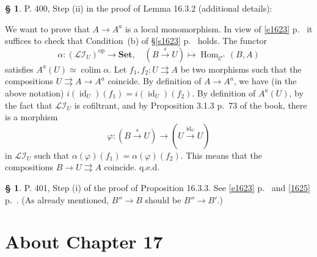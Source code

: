\documentclass[12pt]{article}%
\theoremstyle{remark}
\theoremstyle{definition}
\newtheorem{s}[thm]{\S}%
\newcommand{\cc}{\mathcal}
\newcommand{\C}{\mathcal C}
\newcommand{\Set}{\mathbf{Set}}
\newcommand{\parar}{\rightrightarrows}
\newcommand{\xr}{\xrightarrow}
\DeclareMathOperator*{\colim}{colim}
\DeclareMathOperator{\id}{id}
\DeclareMathOperator{\Hom}{Hom}%
\DeclareMathOperator{\op}{op}
\begin{document}
%

\begin{s} 
P. 400, Step (ii) in the proof of Lemma 16.3.2 (additional details):

We want to prove that $A\to A^a$ is a local monomorphism. In view of \eqref{e1623} p.~\pageref{e1623} it suffices to check that Condition~(b) of \S\ref{s1623} p.~\pageref{s1623} holds. The functor 
$$
\alpha:(\cc{LI}_U)^{\op}\to\Set,\quad(B\xr sU)\mapsto\Hom_{\C^\wedge}(B,A)
$$ 
satisfies $A^a(U)\simeq\colim\alpha$. Let $f_1,f_2:U\parar A$ be two morphisms such that the compositions $U\parar A\to A^a$ coincide. By definition of $A\to A^a$, we have (in the above notation) $i(\id_U)(f_1)=i(\id_U)(f_2)$. By definition of $A^a(U)$, by the fact that $\cc{LI}_U$ is cofiltrant, and by Proposition 3.1.3 p.~73 of the book, there is a morphism 
$$
\varphi:(B\xr sU)\to(U\xr{\id_U}U)
$$ 
in $\cc{LI}_U$ such that $\alpha(\varphi)(f_1)=\alpha(\varphi)(f_2)$. This means that the compositions $B\to U\parar A$ coincide. q.e.d.
\end{s}

%

\begin{s} P. 401, Step (i) of the proof of Proposition 16.3.3. See \eqref{e1623} p.~\pageref{e1623} and \eqref{1625} p.~\pageref{1625}. (As already mentioned, $B''\to B$ should be $B''\to B'$.)
\end{s}


\section{About Chapter 17}
\end{document}
